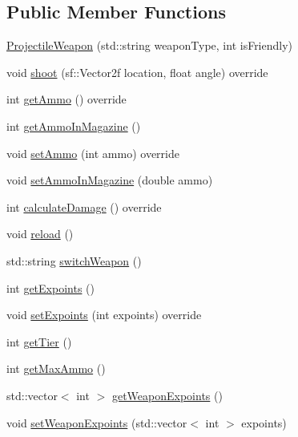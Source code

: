 \subsection*{Public Member Functions}
\begin{DoxyCompactItemize}
\item 
\hyperlink{class_projectile_weapon_a81de964b3548d21ce421418c836382f7}{Projectile\+Weapon} (std\+::string weapon\+Type, int is\+Friendly)
\item 
void \hyperlink{class_projectile_weapon_a699846887ba66070f999db47057e0fc7}{shoot} (sf\+::\+Vector2f location, float angle) override
\item 
int \hyperlink{class_projectile_weapon_ac2f5b5c83f10c8276d55b2ccb7ecb20d}{get\+Ammo} () override
\item 
int \hyperlink{class_projectile_weapon_ae4f099c2cc68a8ce6730cdf7a6af9c2f}{get\+Ammo\+In\+Magazine} ()
\item 
void \hyperlink{class_projectile_weapon_a8de598f1c4d7a6855122bcf5275eef22}{set\+Ammo} (int ammo) override
\item 
void \hyperlink{class_projectile_weapon_a81ed9a87457b1d2bb981c3e6d2edb718}{set\+Ammo\+In\+Magazine} (double ammo)
\item 
int \hyperlink{class_projectile_weapon_ac22fc52f32322606f406da802effadf0}{calculate\+Damage} () override
\item 
void \hyperlink{class_projectile_weapon_ac3db103d22e626c9c768e558f4acc400}{reload} ()
\item 
std\+::string \hyperlink{class_projectile_weapon_a2340178be143bc55fa7f6f06ef734cdc}{switch\+Weapon} ()
\item 
int \hyperlink{class_projectile_weapon_a33ecba020d6cb082526de8d771c2e80f}{get\+Expoints} ()
\item 
void \hyperlink{class_projectile_weapon_ac2051c4518fcc9c04ee6b44adeffb0c2}{set\+Expoints} (int expoints) override
\item 
int \hyperlink{class_projectile_weapon_a527dc08d45143ff4e1aabef407bbcffa}{get\+Tier} ()
\item 
int \hyperlink{class_projectile_weapon_a3a9ecd0524dfd10e721b215a3650b865}{get\+Max\+Ammo} ()
\item 
std\+::vector$<$ int $>$ \hyperlink{class_projectile_weapon_a43212edcad2cf1f68f0137ce0fe6db92}{get\+Weapon\+Expoints} ()
\item 
void \hyperlink{class_projectile_weapon_a84ba268c474eccf700ecc9413bd6e18d}{set\+Weapon\+Expoints} (std\+::vector$<$ int $>$ expoints)
\end{DoxyCompactItemize}


